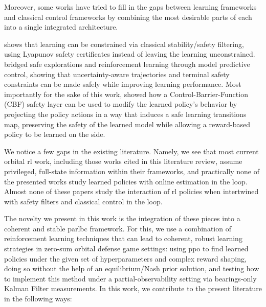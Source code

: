 Moreover, some works have tried to fill in the gaps between learning frameworks and classical control frameworks by combining the most desirable parts of each into a single integrated architecture.

\cite{berkenkamp2017safembrl} shows that learning can be constrained via classical stability/safety filtering, using Lyapunov safety certificates instead of leaving the learning unconstrained. \cite{koller2019safeexplorationrl} bridged safe explorations and reinforcement learning through model predictive control, showing that uncertainty-aware trajectories and terminal safety constraints can be made safely while improving learning performance. Most importantly for the sake of this work, \cite{emam2021saferlrcbf} showed how a Control-Barrier-Function (CBF) safety layer can be used to modify the learned policy's behavior by projecting the policy actions in a way that induces a safe learning transitions map, preserving the safety of the learned model while allowing a reward-based policy to be learned on the side.

We notice a few gaps in the existing literature. Namely, we see that most current orbital \acs{rl} work, including those works cited in this literature review, assume privileged, full-state information within their frameworks, and practically none of the presented works study learned policies with online estimation in the loop. Almost none of these papers study the interaction of \acs{rl} policies when intertwined with safety filters and classical control in the loop. 

The novelty we present in this work is the integration of these pieces into a coherent and stable \acs{parlbc} framework. For this, we use a combination of reinforcement learning techniques that can lead to coherent, robust learning strategies in zero-sum orbital defense game settings: using \acs{ppo} to find learned policies under the given set of hyperparameters and complex reward shaping, doing so without the help of an equilibrium/Nash prior solution, and testing how to implement this method under a partial-observability setting via bearings-only Kalman Filter measurements. In this work, we contribute to the present literature in the following ways:

